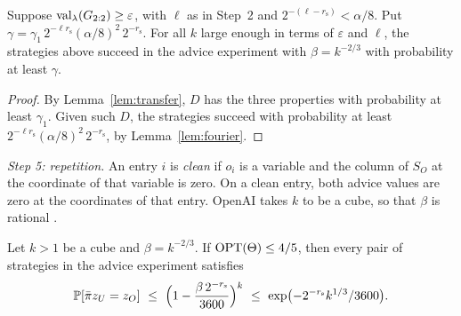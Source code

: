\begin{proposition}\label{prop:decoding}
Suppose $\operatorname{val}_\lambda(G_{2:2})\ge\varepsilon$, with $\ell$ as in Step~2 and $2^{-(\ell-r_{\mathrm s})}<\alpha/8$. Put $\gamma=\gamma_1\,2^{-\ell r_{\mathrm s}}(\alpha/8)^2\,2^{-r_{\mathrm s}}$. For all $k$ large enough in terms of $\varepsilon$ and $\ell$, the strategies above succeed in the advice experiment with $\beta=k^{-2/3}$ with probability at least $\gamma$.
\end{proposition}

\begin{proof}
By Lemma~\ref{lem:transfer}, $D$ has the three properties with probability at least $\gamma_1$. Given such $D$, the strategies succeed with probability at least $2^{-\ell r_{\mathrm s}}(\alpha/8)^2\,2^{-r_{\mathrm s}}$, by Lemma~\ref{lem:fourier}.
\end{proof}

\emph{Step 5: repetition.}\label{nt:clean} An entry $i$ is \emph{clean} if $o_i$ is a variable and the column of $S_O$ at the coordinate of that variable is zero. On a clean entry, both advice values are zero at the coordinates of that entry. OpenAI takes $k$ to be a cube, so that $\beta$ is rational \cite[Section~7]{OAI}.

\begin{lemma}\label{lem:clean}
Let $k>1$ be a cube and $\beta=k^{-2/3}$. If $\operatorname{OPT}(\Theta)\le4/5$, then every pair of strategies in the advice experiment satisfies
\[
\Prob[\bar\pi z_U=z_O]\ \le\ \Bigl(1-\frac{\beta\,2^{-r_{\mathrm s}}}{3600}\Bigr)^k\ \le\ \exp\bigl(-2^{-r_{\mathrm s}}k^{1/3}/3600\bigr).
\]
\end{lemma}


